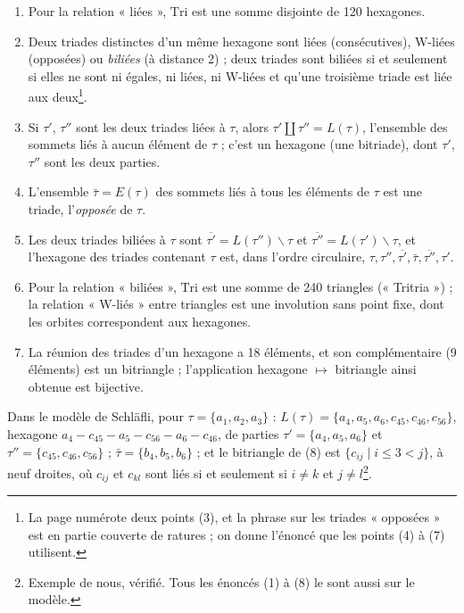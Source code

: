 \documentclass[11pt,a4paper]{article}
\begin{document}
\begin{enumerate}
\item[(1)] Pour la relation « liées », $\mathrm{Tri}$ est une somme disjointe de
  120 hexagones.
\item[(2)--(3)] Deux triades distinctes d'un même hexagone sont liées
  (consécutives), W-liées (opposées) ou \emph{biliées} (à distance 2) ; deux
  triades sont biliées si et seulement si elles ne sont ni égales, ni liées,
  ni W-liées et qu'une troisième triade est liée aux deux\footnote{La page
  numérote deux points (3), et la phrase sur les triades « opposées » est en
  partie couverte de ratures ; on donne l'énoncé que les points (4) à (7)
  utilisent.}.
\item[(4)] Si $\tau'$, $\tau''$ sont les deux triades liées à $\tau$, alors
  $\tau' \amalg \tau'' = L(\tau)$, l'ensemble des sommets liés à aucun élément
  de $\tau$ ; c'est un hexagone (une bitriade), dont $\tau'$, $\tau''$ sont les
  deux parties.
\item[(5)] L'ensemble $\bar\tau = E(\tau)$ des sommets liés à tous les
  éléments de $\tau$ est une triade, l'\emph{opposée} de $\tau$.
\item[(6)] Les deux triades biliées à $\tau$ sont $\overline{\tau'} =
  L(\tau'') \smallsetminus \tau$ et $\overline{\tau''} = L(\tau')
  \smallsetminus \tau$, et l'hexagone des triades contenant $\tau$ est, dans
  l'ordre circulaire, $\tau, \tau'', \overline{\tau'}, \bar\tau,
  \overline{\tau''}, \tau'$.
\item[(7)] Pour la relation « biliées », $\mathrm{Tri}$ est une somme de 240
  triangles (« Tritria ») ; la relation « W-liés » entre triangles est une
  involution sans point fixe, dont les orbites correspondent aux hexagones.
\item[(8)] La réunion des triades d'un hexagone a 18 éléments, et son
  complémentaire (9 éléments) est un bitriangle ; l'application hexagone
  $\mapsto$ bitriangle ainsi obtenue est bijective.
\end{enumerate}

Dans le modèle de Schläfli, pour $\tau = \lbrace a_1, a_2, a_3\rbrace$ :
$L(\tau) = \lbrace a_4, a_5, a_6, c_{45}, c_{46}, c_{56}\rbrace$, hexagone
$a_4 - c_{45} - a_5 - c_{56} - a_6 - c_{46}$, de parties $\tau' = \lbrace a_4,
a_5, a_6\rbrace$ et $\tau'' = \lbrace c_{45}, c_{46}, c_{56}\rbrace$ ; $\bar\tau
= \lbrace b_4, b_5, b_6\rbrace$ ; et le bitriangle de (8) est $\lbrace c_{ij}
\mid i \leq 3 < j\rbrace$, à neuf droites, où $c_{ij}$ et $c_{kl}$ sont liés si
et seulement si $i \neq k$ et $j \neq l$\footnote{Exemple de nous, vérifié.
Tous les énoncés (1) à (8) le sont aussi sur le modèle.}.
\end{document}
